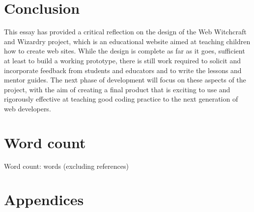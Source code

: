 \documentclass[a4paper, 12pt]{article}
\begin{document}
\section{Conclusion}
This essay has provided a critical reflection on the design of the Web Witchcraft and Wizardry project, which is an educational website aimed at teaching children how to create web sites. While the design is complete as far as it goes, sufficient at least to build a working prototype, there is still work required to solicit and incorporate feedback from students and educators and to write the lessons and mentor guides. The next phase of development will focus on these aspects of the project, with the aim of creating a final product that is exciting to use and rigorously effective at teaching good coding practice to the next generation of web developers.

\section*{Word count}
Word count:  words (excluding references)
\\


\newpage
\appendix
\section*{Appendices}

\end{document}
